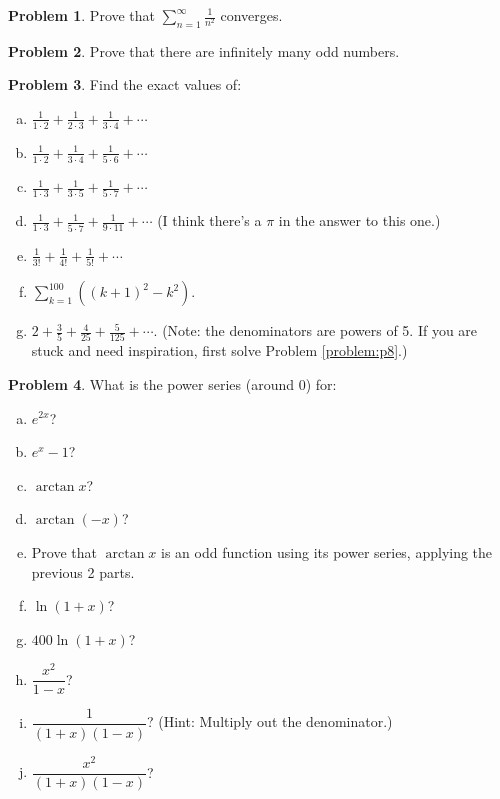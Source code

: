 \documentclass[11pt,oneside]{amsart}
\theoremstyle{definition}
\newtheorem{problem}{Problem}
\begin{document}
\begin{problem}
Prove that $\displaystyle\sum_{n=1}^\infty \frac 1{n^2}$ converges.
\end{problem}

\begin{problem}
Prove that there are infinitely many odd numbers.
\end{problem}

\begin{problem}
Find the exact values of:
\begin{enumerate}[(a)]
  \item $\displaystyle\frac 1{1\cdot 2}+\frac 1{2\cdot 3}+\frac 1{3\cdot 4}+\cdots$
  \item $\displaystyle\frac 1{1\cdot 2}+\frac 1{3\cdot 4}+\frac 1{5\cdot 6}+\cdots$
  \item $\displaystyle\frac 1{1\cdot 3}+\frac 1{3\cdot 5}+\frac 1{5\cdot 7}+\cdots$
  \item $\displaystyle\frac 1{1\cdot 3}+\frac 1{5\cdot 7}+\frac 1{9\cdot 11}+\cdots$ (I think there's a $\pi$ in the answer to this one.)
  \item $\displaystyle\frac 1{3!}+\frac 1{4!}+\frac 1{5!}+\cdots$
  \item $\displaystyle\sum_{k=1}^{100} ((k+1)^2-k^2)$.
  \item $\displaystyle 2+\frac 35+\frac 4{25}+\frac 5{125}+\cdots$. (Note: the denominators are powers of 5. If you are stuck and need inspiration, first solve Problem \ref{problem:p8}.)
\end{enumerate}
\end{problem}

\begin{problem}
What is the power series (around 0) for:
\begin{enumerate}[(a)]
  \item $e^{2x}$?
  \item $e^x-1$?
  \item $\arctan x$?
  \item $\arctan(-x)$?
  \item Prove that $\arctan x$ is an odd function using its power series, applying the previous 2 parts.
  \item $\ln(1+x)$?
  \item $400\ln(1+x)$?
  \item $\dfrac{x^2}{1-x}$?
  \item $\dfrac 1{(1+x)(1-x)}$? (Hint: Multiply out the denominator.)
  \item $\dfrac {x^2}{(1+x)(1-x)}$?
\end{enumerate}
\end{problem}
\end{document}
